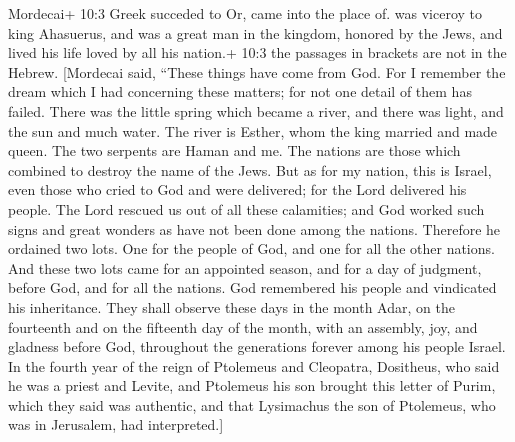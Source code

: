  Mordecai+ 10:3 Greek succeded to Or, came into the place
of. was viceroy to king Ahasuerus, and was a great man in the kingdom,
honored by the Jews, and lived his life loved by all his nation.+ 10:3
the passages in brackets are not in the Hebrew.  {[}Mordecai
said, ``These things have come from God.  For I remember the
dream which I had concerning these matters; for not one detail of them
has failed.  There was the little spring which became a
river, and there was light, and the sun and much water. The river is
Esther, whom the king married and made queen.  The two
serpents are Haman and me.  The nations are those which
combined to destroy the name of the Jews.  But as for my
nation, this is Israel, even those who cried to God and were delivered;
for the Lord delivered his people. The Lord rescued us out of all these
calamities; and God worked such signs and great wonders as have not been
done among the nations.  Therefore he ordained two lots.
One for the people of God, and one for all the other nations.
 And these two lots came for an appointed season, and for a
day of judgment, before God, and for all the nations.  God
remembered his people and vindicated his inheritance.  They
shall observe these days in the month Adar, on the fourteenth and on the
fifteenth day of the month, with an assembly, joy, and gladness before
God, throughout the generations forever among his people Israel.
 In the fourth year of the reign of Ptolemeus and
Cleopatra, Dositheus, who said he was a priest and Levite, and Ptolemeus
his son brought this letter of Purim, which they said was authentic, and
that Lysimachus the son of Ptolemeus, who was in Jerusalem, had
interpreted.{]}
